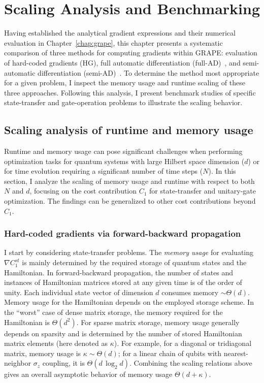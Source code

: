 \chapter{Scaling Analysis and Benchmarking}
\label{chap:scaling}

Having established the analytical gradient expressions and their numerical evaluation in Chapter~\ref{chap:grape}, this chapter presents a systematic comparison of three methods for computing gradients within GRAPE: evaluation of hard-coded gradients (HG), full automatic differentiation (full-AD)~\cite{pacleung2017speedup}, and semi-automatic differentiation (semi-AD)~\cite{semiadgoerz2022quantum}. To determine the method most appropriate for a given problem, I inspect the memory usage and runtime scaling of these three approaches. Following this analysis, I present benchmark studies of specific state-transfer and gate-operation problems to illustrate the scaling behavior.

\section{Scaling analysis of runtime and memory usage}
\label{sec:scaling_analysis}

Runtime and memory usage can pose significant challenges when performing optimization tasks for quantum systems with large Hilbert space dimension ($d$) or for time evolution requiring a significant number of time steps ($N$). In this section, I analyze the scaling of memory usage and runtime with respect to both $N$ and $d$, focusing on the cost contribution $C_1$ for state-transfer and unitary-gate optimization. The findings can be generalized to other cost contributions beyond $C_1$.

\subsection{Hard-coded gradients via forward-backward propagation}
\label{sec:HG_scaling}

I start by considering state-transfer problems. The \textit{memory usage} for evaluating $\nabla C_1^{st}$ is mainly determined by the required storage of quantum states and the Hamiltonian. In forward-backward propagation, the number of states and instances of Hamiltonian matrices stored at any given time is of the order of unity. Each individual state vector of dimension $d$ consumes memory $\sim\Theta(d)$. Memory usage for the Hamiltonian depends on the employed storage scheme. In the ``worst'' case of dense matrix storage, the memory required for the Hamiltonian is $\Theta(d^2)$. For sparse matrix storage, memory usage generally depends on sparsity and is determined by the number of stored Hamiltonian matrix elements (here denoted as $\kappa$).%
For example, for a diagonal or tridiagonal matrix, memory usage is $\kappa\sim\Theta(d)$; for a linear chain of qubits with nearest-neighbor $\sigma_z$ coupling, it is $\Theta(d\, \log_2 d)$. Combining the scaling relations above gives an overall asymptotic behavior of memory usage $\Theta(d+\kappa)$.

